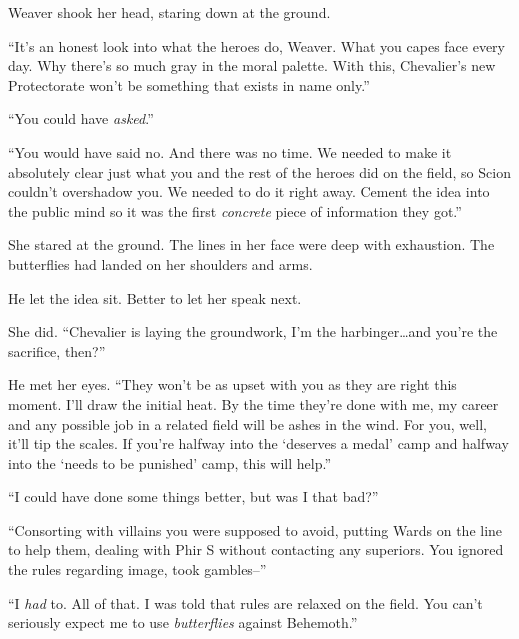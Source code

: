 Weaver shook her head, staring down at the ground.



``It's an honest look into what the heroes do, Weaver.  What you capes face every day.  Why there's so much gray in the moral palette.  With this, Chevalier's new Protectorate won't be something that exists in name only.''



``You could have \emph{asked}.''



``You would have said no.  And there was no time.  We needed to make it absolutely clear just what you and the rest of the heroes did on the field, so Scion couldn't overshadow you.  We needed to do it right away.  Cement the idea into the public mind so it was the first \emph{concrete} piece of information they got.''



She stared at the ground.  The lines in her face were deep with exhaustion.  The butterflies had landed on her shoulders and arms.



He let the idea sit.  Better to let her speak next.



She did.  ``Chevalier is laying the groundwork, I'm the harbinger\ldots and you're the sacrifice, then?''



He met her eyes.  ``They won't be as upset with you as they are right this moment.  I'll draw the initial heat.  By the time they're done with me, my career and any possible job in a related field will be ashes in the wind.  For you, well, it'll tip the scales.  If you're halfway into the `deserves a medal' camp and halfway into the `needs to be punished' camp, this will help.''



``I could have done some things better, but was I that bad?''



``Consorting with villains you were supposed to avoid, putting Wards on the line to help them, dealing with Phir S without contacting any superiors.  You ignored the rules regarding image, took gambles--''



``I \emph{had} to.  All of that.  I was told that rules are relaxed on the field.  You can't seriously expect me to use \emph{butterflies} against Behemoth.''



